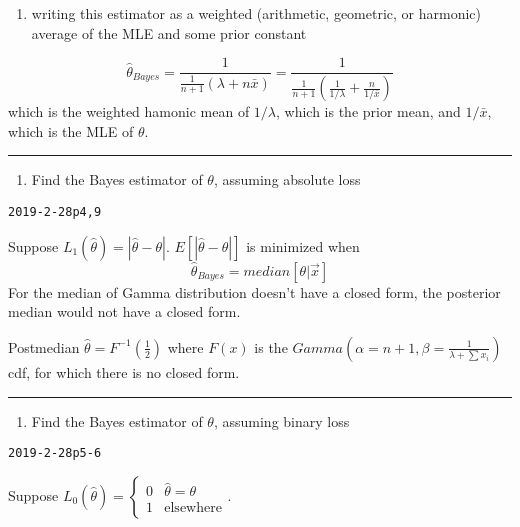 \documentclass[12pt,]{article}
\providecommand{\tightlist}{%
  \setlength{\itemsep}{0pt}\setlength{\parskip}{0pt}}
\begin{document}
\begin{enumerate}
\def\labelenumi{\alph{enumi}.}
\setcounter{enumi}{2}
\tightlist
\item
  \textcolor[rgb]{0.5,0.5,0.5}{writing this estimator as a weighted (arithmetic, geometric, or harmonic) average of the MLE and some prior constant}
\end{enumerate}

\[\hat\theta_{Bayes}=\frac1{\frac1{n+1}(\lambda+n\bar x)}=\frac1{\frac1{n+1}(\frac1{1/\lambda}+\frac{n}{1/\bar x})}\]
which is the weighted hamonic mean of \(1/\lambda\), which is the prior
mean, and \(1/\bar x\), which is the MLE of \(\theta\).

\begin{center}\rule{0.5\linewidth}{\linethickness}\end{center}

\begin{enumerate}
\def\labelenumi{\alph{enumi}.}
\setcounter{enumi}{3}
\tightlist
\item
  \textcolor[rgb]{0.5,0.5,0.5}{Find the Bayes estimator of $\theta$, assuming absolute loss}
\end{enumerate}

\texttt{2019-2-28p4,9}

Suppose \(L_1(\hat\theta)=|\hat\theta-\theta|\).
\(E[|\hat\theta-\theta|]\) is minimized when
\[\hat\theta_{Bayes}=median[\theta|\vec x]\] For the median of Gamma
distribution doesn't have a closed form, the posterior median would not
have a closed form.

Postmedian \(\hat\theta=F^{-1}(\frac12)\) where \(F(x)\) is the
\(Gamma(\alpha=n+1,\beta=\frac1{\lambda+\sum x_i})\) cdf, for which
there is no closed form.

\begin{center}\rule{0.5\linewidth}{\linethickness}\end{center}

\begin{enumerate}
\def\labelenumi{\alph{enumi}.}
\setcounter{enumi}{4}
\tightlist
\item
  \textcolor[rgb]{0.5,0.5,0.5}{Find the Bayes estimator of $\theta$, assuming binary loss}
\end{enumerate}

\texttt{2019-2-28p5-6}

Suppose
\(L_0(\hat\theta)=\begin{cases}0&\hat\theta=\theta\\1&\text{elsewhere}\end{cases}\).
\end{document}

